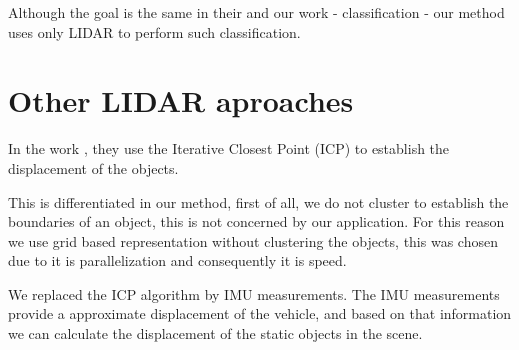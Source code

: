 Although the goal is the same in their and our work - classification - our method uses only LIDAR to perform such classification.

\section{Other LIDAR aproaches}

In the work \cite{4650636}, they use the Iterative Closest Point (ICP) \cite{10.1109/34.121791} to establish the displacement of the objects. 

This is differentiated in our method, first of all, we do not cluster to establish the boundaries of an object, this is not concerned by our application. For this reason we use grid based representation without clustering the objects, this was chosen due to it is parallelization and consequently it is speed.

We replaced the ICP algorithm by IMU measurements. The IMU measurements provide a approximate displacement of the vehicle, and based on that information we can calculate the displacement of the static objects in the scene.  
